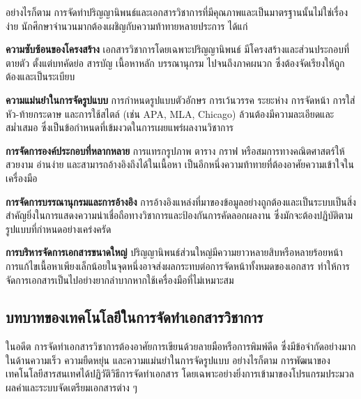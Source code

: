 \hspace*{1.5em} %
อย่างไรก็ตาม การจัดทำปริญญานิพนธ์และเอกสารวิชาการที่มีคุณภาพและเป็นมาตรฐานนั้นไม่ใช่เรื่องง่าย นักศึกษาจำนวนมากต้องเผชิญกับความท้าทายหลายประการ ได้แก่
\begin{mycustomitem}
    \item \textbf{ความซับซ้อนของโครงสร้าง} เอกสารวิชาการโดยเฉพาะปริญญานิพนธ์ มีโครงสร้างและส่วนประกอบที่ตายตัว ตั้งแต่บทคัดย่อ สารบัญ เนื้อหาหลัก บรรณานุกรม ไปจนถึงภาคผนวก ซึ่งต้องจัดเรียงให้ถูกต้องและเป็นระเบียบ
    \item \textbf{ความแม่นยำในการจัดรูปแบบ} การกำหนดรูปแบบตัวอักษร การเว้นวรรค ระยะห่าง การจัดหน้า การใส่หัว-ท้ายกระดาษ และการใช้สไตล์ (เช่น APA, MLA, Chicago) ล้วนต้องมีความละเอียดและสม่ำเสมอ ซึ่งเป็นข้อกำหนดที่เข้มงวดในการเผยแพร่ผลงานวิชาการ
    \item \textbf{การจัดการองค์ประกอบที่หลากหลาย} การแทรกรูปภาพ ตาราง กราฟ หรือสมการทางคณิตศาสตร์ให้สวยงาม อ่านง่าย และสามารถอ้างอิงถึงได้ในเนื้อหา เป็นอีกหนึ่งความท้าทายที่ต้องอาศัยความเข้าใจในเครื่องมือ
    \item \textbf{การจัดการบรรณานุกรมและการอ้างอิง} การอ้างอิงแหล่งที่มาของข้อมูลอย่างถูกต้องและเป็นระบบเป็นสิ่งสำคัญยิ่งในการแสดงความน่าเชื่อถือทางวิชาการและป้องกันการคัดลอกผลงาน ซึ่งมักจะต้องปฏิบัติตามรูปแบบที่กำหนดอย่างเคร่งครัด
    \item \textbf{การบริหารจัดการเอกสารขนาดใหญ่} ปริญญานิพนธ์ส่วนใหญ่มีความยาวหลายสิบหรือหลายร้อยหน้า การแก้ไขเนื้อหาเพียงเล็กน้อยในจุดหนึ่งอาจส่งผลกระทบต่อการจัดหน้าทั้งหมดของเอกสาร ทำให้การจัดการเอกสารเป็นไปอย่างยากลำบากหากใช้เครื่องมือที่ไม่เหมาะสม
\end{mycustomitem}



\subsection{บทบาทของเทคโนโลยีในการจัดทำเอกสารวิชาการ}

\hspace*{1.5em} %
ในอดีต การจัดทำเอกสารวิชาการต้องอาศัยการเขียนด้วยลายมือหรือการพิมพ์ดีด ซึ่งมีข้อจำกัดอย่างมากในด้านความเร็ว ความยืดหยุ่น และความแม่นยำในการจัดรูปแบบ อย่างไรก็ตาม การพัฒนาของเทคโนโลยีสารสนเทศได้ปฏิวัติวิธีการจัดทำเอกสาร โดยเฉพาะอย่างยิ่งการเข้ามาของโปรแกรมประมวลผลคำและระบบจัดเตรียมเอกสารต่าง ๆ


